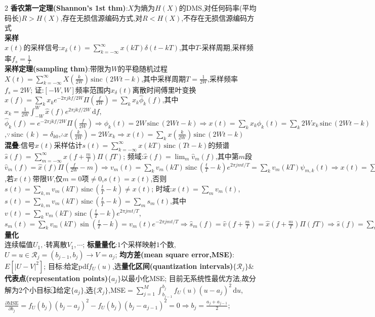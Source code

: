 \documentclass[UTF8,a4paper,10pt]{article}
\providecommand{\abs}[1]{\left\lvert#1\right\rvert}
\providecommand{\sinc}{\,\mathrm{sinc}\,}
\begin{document}
\begin{multicols*}{2}
\textbf{香农第一定理(Shannon's 1st thm)}:$X$为熵为$H(X)$的DMS,对任何码率(平均码长)$R>H(X)$,存在无损信源编码方式,对$R<H(X)$,不存在无损信源编码方式\\
\textbf{采样}\hrulefill\\
$x(t)$的采样信号:$x_{\delta}(t)=\sum_{k=-\infty}^{\infty}x(kT)\delta(t-kT)$,其中$T$-采样周期,采样频率$f_s=\frac{1}{T}$\\
\textbf{采样定理(sampling thm)}:带限为$W$的平稳随机过程$X(t)=\sum_{k=-\infty}^{\infty}X(\frac{k}{2W})\sinc(2Wt-k)$,其中采样周期$T=\frac{1}{2W}$,采样频率$f_s=2W$;%
    证:$[-W,W]$频率范围内$x_{\delta}(t)$离散时间傅里叶变换$\hat{x}(f)=\sum_kx_ke^{-2\pi jkf/2W}\Pi(\frac{f}{2W})=\sum_kx_k\hat{\phi}_k(f)$,其中$x_k=\frac{1}{2W}\int_{-W}^W\hat{x}(f)e^{2\pi jkf/2W}\,\mathrm{d}f$,$\hat{\phi}_k(f)=e^{-2\pi jkf/2W}\Pi(\frac{f}{2W})\Rightarrow\phi_k(t)=2W\sinc(2Wt-k)\Rightarrow x(t)=\sum_kx_k\phi_k(t)=\sum_k2Wx_k\sinc(2Wt-k)$,$\because\sinc(k)=\delta_{k0}$,$\therefore x(\frac{k}{2W})=2Wx_k\Rightarrow x(t)=\sum_kx(\frac{k}{2W})\sinc(2Wt-k)$\\
\textbf{混叠}:信号$x(t)$采样估计$s(t)=\sum_{k=-\infty}^{\infty}x(kT)\sinc(Tt-k)$的频谱$\hat{s}(f)=\sum_{m=-\infty}^{\infty}\hat{x}(f+\frac{m}{T})\Pi(fT)$;%
    频域:$\hat{x}(f)=\lim_m\hat{v}_m(f)$,其中第$m$段$\hat{v}_m(f)=\hat{x}(f)\Pi(\frac{f}{2W}-m)\Rightarrow v_m(t)=\sum_kv_m(kT)\sinc(\frac{t}{T}-k)e^{2\pi jmt/T}=\sum_kv_m(kT)\psi_{m,k}(t)\Rightarrow x(t)=\sum_{m,k}v_m(kT)\sinc(\frac{t}{T}-k)e^{2\pi jmt/T}$,若$x(t)$带限$W$,仅$m=0$项$\neq 0$,$s(t)=x(t)$,否则$s(t)=\sum_{k,m}v_m(kT)\sinc(\frac{t}{T}-k)\neq x(t)$;%
    时域:$x(t)=\sum_mv_m(t)$,$s(t)=\sum_{k,m}v_m(kT)\sinc(\frac{t}{T}-k)=\sum_ms_m(t)$,其中$v(t)=\sum_kv_m(kT)\sinc(\frac{t}{T}-k)e^{2\pi jmt/T}$,$s_m(t)=\sum_kv_m(kT)\sin(\frac{t}{T}-k)=v_m(t)e^{-2\pi jmt/T}\Rightarrow\hat{s}_m(f)=\hat{v}(f+\frac{m}{T})=\hat{x}(f+\frac{m}{T})\Pi(fT)\Rightarrow\hat{s}(f)=\sum_m\hat{x}(f+\frac{m}{T})\Pi(fT)$\\
\textbf{量化}\hrulefill\\
连续幅值$U_1,\cdot$转离散$V_1,\cdots$;%
    \textbf{标量量化}:$1$个采样映射$1$个数,$U=u\in\mathcal{R}_j=(b_{j-1},b_j)\rightarrow V=a_j$;%
    \textbf{均方差(mean square error,MSE)}:$E[\abs{U-V}^2]$;%
    目标:给定pdf$f_U(u)$,选\textbf{量化区间(quantization intervals)}$\{\mathcal{R}_j\}$\&\textbf{代表点(representation points)}$\{a_j\}$以最小化MSE;%
    目前无系统性最优方法,故分解为$2$个小目标:\textcircled{1}给定$\{a_j\}$,选$\{\mathcal{R}_j\}$,MSE$=\sum_{j=1}^M\int_{b_{j-1}}^{b_j}f_U(u)(u-a_j)^2\,\mathrm{d}u$,$\frac{\partial\text{MSE}}{\partial b_j}=f_U(b_j)(b_j-a_j)^2-f_U(b_j)(b_j-a_{j-1})^2=0\Rightarrow b_j=\frac{a_j+a_{j-1}}{2}$;%

\end{multicols*}
\end{document}

